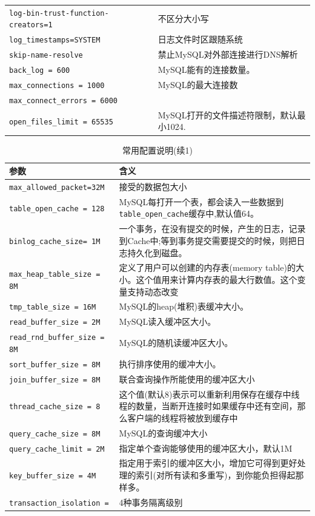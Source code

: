 \documentclass[UTF8,a4paper,12pt]{ctexbook}
\begin{document}
\begin{table}[H]
\begin{tabular}{p{8cm}<{\centering}|p{10cm}<{\centering}}
						\verb|log-bin-trust-function-creators=1  | &不区分大小写  \\
						\verb|log_timestamps=SYSTEM  | & 日志文件时区跟随系统 \\	
						\verb|skip-name-resolve  | & 禁止MySQL对外部连接进行DNS解析 \\				
						\verb|back_log = 600  | & MySQL能有的连接数量。 \\
						\verb|max_connections = 1000  | & MySQL的最大连接数 \\
						\verb|max_connect_errors = 6000  | &  \\
						\verb|open_files_limit = 65535  | & MySQL打开的文件描述符限制，默认最小1024. \\								
					\bottomrule
				\end{tabular}
			\end{table}
			
			\begin{table}[H]
				\centering
				\caption{常用配置说明(续1)}
				\begin{tabular}{p{6cm}<{\centering}|p{12cm}<{\centering}}
					\toprule
						参数 &  含义 \\
					\midrule
						\verb|max_allowed_packet=32M  | & 接受的数据包大小 \\
						\verb|table_open_cache = 128  | & MySQL每打开一个表，都会读入一些数据到\verb|table_open_cache|缓存中,默认值64。 \\	
						\verb|binlog_cache_size= 1M  | & 一个事务，在没有提交的时候，产生的日志，记录到Cache中;等到事务提交需要提交的时候，则把日志持久化到磁盘。 \\
						\verb|max_heap_table_size = 8M  | & 定义了用户可以创建的内存表(memory table)的大小。这个值用来计算内存表的最大行数值。这个变量支持动态改变 \\
						\verb|tmp_table_size = 16M  | & MySQL的heap(堆积)表缓冲大小。 \\
						\verb|read_buffer_size = 2M  | & MySQL读入缓冲区大小。 \\
						\verb|read_rnd_buffer_size = 8M  | & MySQL的随机读缓冲区大小。 \\
						\verb|sort_buffer_size = 8M  | & 执行排序使用的缓冲大小。 \\
						\verb|join_buffer_size = 8M  | & 联合查询操作所能使用的缓冲区大小 \\
						\verb|thread_cache_size = 8  | & 这个值(默认8)表示可以重新利用保存在缓存中线程的数量，当断开连接时如果缓存中还有空间，那么客户端的线程将被放到缓存中 \\
						\verb|query_cache_size = 8M  | & MySQL的查询缓冲大小 \\
						\verb|query_cache_limit = 2M | & 指定单个查询能够使用的缓冲区大小，默认1M\\
						\verb|key_buffer_size = 4M | & 指定用于索引的缓冲区大小，增加它可得到更好处理的索引(对所有读和多重写)，到你能负担得起那样多。\\
						\verb|transaction_isolation = | & 4种事务隔离级别\\
					\bottomrule
				\end{tabular}
			\end{table}
			
\end{document}
